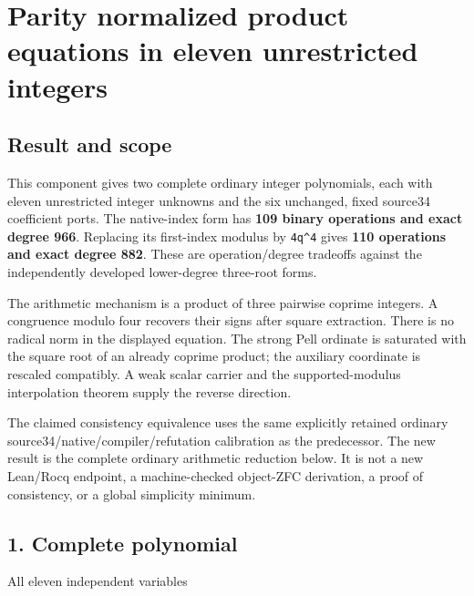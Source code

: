 \section{Parity normalized product equations in eleven unrestricted integers}



\subsection{Result and scope}



This component gives two complete ordinary integer polynomials, each with eleven unrestricted integer unknowns and the six unchanged, fixed source34 coefficient ports. The native-index form has \textbf{109 binary operations and exact degree 966}. Replacing its first-index modulus by \texttt{4q\textasciicircum{}\allowbreak{}4} gives \textbf{110 operations and exact degree 882}. These are operation/\allowbreak{}degree tradeoffs against the independently developed lower-degree three-root forms.



The arithmetic mechanism is a product of three pairwise coprime integers. A congruence modulo four recovers their signs after square extraction. There is no radical norm in the displayed equation. The strong Pell ordinate is saturated with the square root of an already coprime product; the auxiliary coordinate is rescaled compatibly. A weak scalar carrier and the supported-modulus interpolation theorem supply the reverse direction.



The claimed consistency equivalence uses the same explicitly retained ordinary source34/\allowbreak{}native/\allowbreak{}compiler/\allowbreak{}refutation calibration as the predecessor. The new result is the complete ordinary arithmetic reduction below. It is not a new Lean/\allowbreak{}Rocq endpoint, a machine-checked object-ZFC derivation, a proof of consistency, or a global simplicity minimum.



\subsection{1. Complete polynomial}



All eleven independent variables



